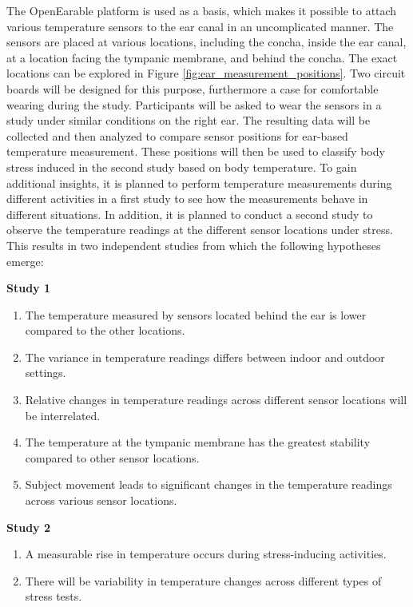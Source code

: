 The OpenEarable platform is used as a basis, which makes it possible to attach various temperature sensors to the ear canal in an uncomplicated manner. 
The sensors are placed at various locations, including the concha, inside the ear canal, at a location facing the tympanic membrane, and behind the concha.
The exact locations can be explored in Figure \ref{fig:ear_measurement_positions}.
Two circuit boards will be designed for this purpose, furthermore a case for comfortable wearing during the study.
Participants will be asked to wear the sensors in a study under similar conditions on the right ear.
The resulting data will be collected and then analyzed to compare sensor positions for ear-based temperature measurement. 
These positions will then be used to classify body stress induced in the second study based on body temperature.
To gain additional insights, it is planned to perform temperature measurements during different activities in a first study to see how the measurements behave in different situations. 
In addition, it is planned to conduct a second study to observe the temperature readings at the different sensor locations under stress.
This results in two independent studies from which the following hypotheses emerge:

\textbf{Study 1}
\begin{enumerate}[label=H\arabic{*}:]
  \item The temperature measured by sensors located behind the ear is lower compared to the other locations.
  \item The variance in temperature readings differs between indoor and outdoor settings.
  \item Relative changes in temperature readings across different sensor locations will be interrelated.
  \item The temperature at the tympanic membrane has the greatest stability compared to other sensor locations.
  \item Subject movement leads to significant changes in the temperature readings across various sensor locations.
\end{enumerate}

\textbf{Study 2}
\begin{enumerate}[label=H\arabic{*}:]
  \item A measurable rise in temperature occurs during stress-inducing activities.
  \item There will be variability in temperature changes across different types of stress tests.
\end{enumerate}

